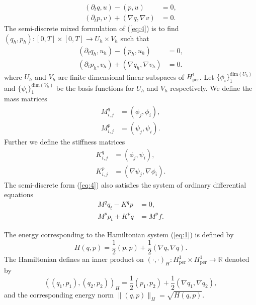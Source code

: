 \documentclass[12pt]{article}
\begin{document}
\begin{equation} \label{eq:3}
\begin{aligned}
	(\partial_t q , u) - (p,u) &= 0, \\
	(\partial_t p , v) + (\nabla q, \nabla v) &= 0.
\end{aligned}
\end{equation}
The semi-discrete mixed formulation of (\ref{eq:4}) is to find $(q_h,p_h):[0,T]\times[0,T]\to U_h\times V_h$ such that
\begin{equation} \label{eq:4}
\begin{aligned}
	(\partial_t q_h , u_h) - (p_h,u_h) &= 0, \\
	(\partial_t p_h , v_h) + (\nabla q_h, \nabla v_h) &= 0.
\end{aligned}
\end{equation}
where $U_h$ and $V_h$ are finite dimensional linear subspaces of $H^1_{\text{per}}$. Let $\{\phi_i\}_1^{\text{dim}(U_h)}$ and $\{\psi_i\}_1^{\text{dim}(V_h)}$ be the basis functions for $U_h$ and $V_h$ respectively. We define the mass matrices
\begin{equation} \label{eq:5}
\begin{aligned}
	M_{i,j}^q &= (\phi_j,\phi_i), \\
	M_{i,j}^p &= (\psi_j,\psi_i).
\end{aligned}
\end{equation}
Further we define the stiffness matrices
\begin{equation} \label{eq:6}
\begin{aligned}
	K^q_{i,j} &= (\phi_j,\psi_i), \\
	K^p_{i,j} &= (\nabla \psi_j,\nabla \phi_i).
\end{aligned}
\end{equation}
The semi-discrete form (\ref{eq:4}) also satisfies the system of ordinary differential equations
\begin{equation} \label{eq:7}
\begin{aligned}
	M^q q_t - K^q p &= 0, \\
	M^p p_t + K^p q &= M^p f.
\end{aligned}
\end{equation}

The energy corresponding to the Hamiltonian system (\ref{eq:1}) is defined by
\begin{equation} \label{eq:8}
	H(q,p) = \frac 1 2 (p,p) + \frac 1 2 (\nabla q, \nabla q).
\end{equation}
The Hamiltonian defines an inner product on $(\cdot,\cdot)_H : H^1_{\text{per} }\times H^1_{\text{per} }\to \mathbb R$ denoted by
\begin{equation} \label{eq:9}
	( (q_1,p_1) , (q_2,p_2) )_H = \frac 1 2 (p_1,p_2) + \frac 1 2 (\nabla q_1, \nabla q_2),
\end{equation}
and the corresponding energy norm $\| (q,p) \|_H = \sqrt{ H(q,p) }$.
\end{document}
